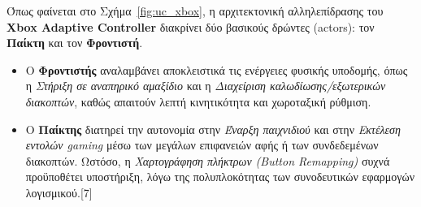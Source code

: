 \documentclass[twoside, a4paper, 11pt]{article}
\begin{document}
Όπως φαίνεται στο Σχήμα~\ref{fig:uc_xbox}, η αρχιτεκτονική αλληλεπίδρασης του \textbf{Xbox Adaptive Controller} διακρίνει δύο βασικούς δρώντες (actors): τον \textbf{Παίκτη} και τον \textbf{Φροντιστή}. 
\begin{itemize}
    \item Ο \textbf{Φροντιστής} αναλαμβάνει αποκλειστικά τις ενέργειες φυσικής υποδομής, όπως η \emph{Στήριξη σε αναπηρικό αμαξίδιο} και η \emph{Διαχείριση καλωδίωσης/εξωτερικών διακοπτών}, καθώς απαιτούν λεπτή κινητικότητα και χωροταξική ρύθμιση.
    \item Ο \textbf{Παίκτης} διατηρεί την αυτονομία στην \emph{Έναρξη παιχνιδιού} και στην \emph{Εκτέλεση εντολών gaming} μέσω των μεγάλων επιφανειών αφής ή των συνδεδεμένων διακοπτών. Ωστόσο, η \emph{Χαρτογράφηση πλήκτρων (Button Remapping)} συχνά προϋποθέτει υποστήριξη, λόγω της πολυπλοκότητας των συνοδευτικών εφαρμογών λογισμικού.[7]
\end{itemize}
\end{document}
